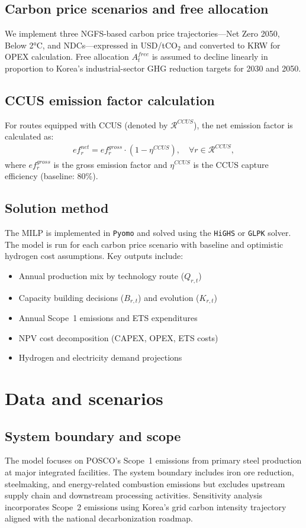 \documentclass[preprint,5p,authoryear]{elsarticle}
\begin{document}
\subsection{Carbon price scenarios and free allocation}
We implement three NGFS-based carbon price trajectories—Net Zero 2050, Below 2°C, and NDCs—expressed in USD/tCO$_2$ and converted to KRW for OPEX calculation. Free allocation $A^{free}_t$ is assumed to decline linearly in proportion to Korea's industrial-sector GHG reduction targets for 2030 and 2050.

\subsection{CCUS emission factor calculation}
For routes equipped with CCUS (denoted by $\mathcal{R}^{CCUS}$), the net emission factor is calculated as:
\begin{align}
ef_r^{net} = ef_r^{gross} \cdot (1 - \eta^{CCUS}), \quad \forall r \in \mathcal{R}^{CCUS},
\end{align}
where $ef_r^{gross}$ is the gross emission factor and $\eta^{CCUS}$ is the CCUS capture efficiency (baseline: 80\%).

\subsection{Solution method}
The MILP is implemented in \texttt{Pyomo} and solved using the \texttt{HiGHS} or \texttt{GLPK} solver. The model is run for each carbon price scenario with baseline and optimistic hydrogen cost assumptions. Key outputs include:
\begin{itemize}[leftmargin=*]
  \item Annual production mix by technology route ($Q_{r,t}$)
  \item Capacity building decisions ($B_{r,t}$) and evolution ($K_{r,t}$)
  \item Annual Scope~1 emissions and ETS expenditures
  \item NPV cost decomposition (CAPEX, OPEX, ETS costs)
  \item Hydrogen and electricity demand projections
\end{itemize}

\section{Data and scenarios}
\subsection{System boundary and scope}
The model focuses on POSCO's Scope~1 emissions from primary steel production at major integrated facilities. The system boundary includes iron ore reduction, steelmaking, and energy-related combustion emissions but excludes upstream supply chain and downstream processing activities. Sensitivity analysis incorporates Scope~2 emissions using Korea's grid carbon intensity trajectory aligned with the national decarbonization roadmap.
\end{document}
